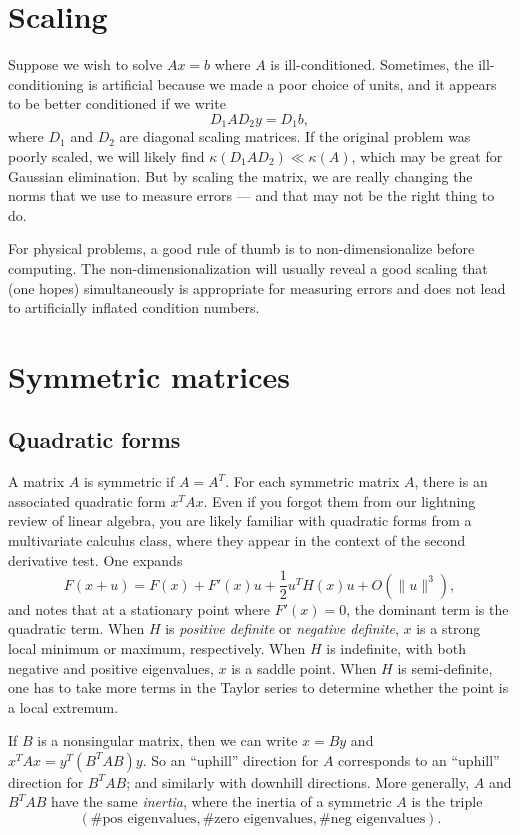 \documentclass[12pt, leqno]{article} %
\begin{document}
\section{Scaling}

Suppose we wish to solve $Ax = b$ where $A$ is ill-conditioned.  Sometimes,
the ill-conditioning is artificial because we made a poor choice of units,
and it appears to be better conditioned if we write
\[
  D_1 A D_2 y = D_1 b,
\]
where $D_1$ and $D_2$ are diagonal scaling matrices.  If the original problem
was poorly scaled, we will likely find $\kappa(D_1 A D_2) \ll \kappa(A)$,
which may be great for Gaussian elimination.  But by scaling the matrix, we
are really changing the norms that we use to measure errors --- and that may
not be the right thing to do.

For physical problems, a good rule of thumb is to non-dimensionalize
before computing.  The non-dimensionalization will usually reveal a good
scaling that (one hopes) simultaneously is appropriate for measuring errors
and does not lead to artificially inflated condition numbers.

\section{Symmetric matrices}

\subsection{Quadratic forms}

A matrix $A$ is symmetric if $A = A^T$.  For each symmetric matrix $A$,
there is an associated quadratic form $x^T A x$.  Even if you forgot
them from our lightning review of linear algebra, you are likely familiar
with quadratic forms from a multivariate calculus class, where they appear
in the context of the second derivative test.  One expands
\[
  F(x+u) = F(x) + F'(x) u + \frac{1}{2} u^T H(x) u + O(\|u\|^3),
\]
and notes that at a stationary point where $F'(x) = 0$, the dominant
term is the quadratic term.  When $H$ is {\em positive definite} or
{\em negative definite}, $x$ is a strong local minimum or maximum,
respectively. When $H$ is indefinite, with both negative and positive
eigenvalues, $x$ is a saddle point.  When $H$ is semi-definite, one has
to take more terms in the Taylor series to determine whether the point
is a local extremum.

If $B$ is a nonsingular matrix, then we can write $x = By$ and $x^T A
x = y^T (B^T A B) y$.  So an ``uphill'' direction for $A$ corresponds
to an ``uphill'' direction for $B^T A B$; and similarly with downhill
directions.  More generally, $A$ and $B^T A B$ have the same {\em inertia},
where the inertia of a symmetric $A$ is the triple
\[
  (\mbox{\# pos eigenvalues},
   \mbox{\# zero eigenvalues},
   \mbox{\# neg eigenvalues}).
\]
\end{document}
